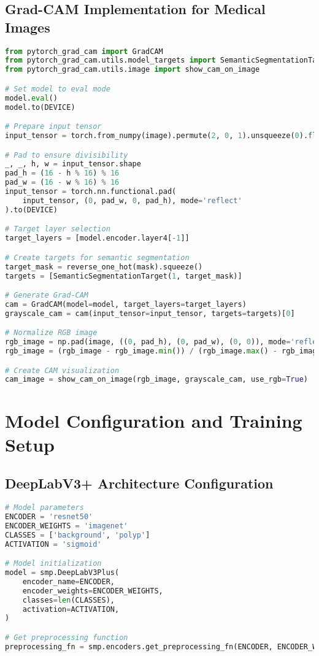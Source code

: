 \documentclass[12pt,a4paper]{report}
\begin{document}
\section{Grad-CAM Implementation for Medical Images}
\begin{lstlisting}[language=Python, caption=Grad-CAM Implementation]
from pytorch_grad_cam import GradCAM
from pytorch_grad_cam.utils.model_targets import SemanticSegmentationTarget
from pytorch_grad_cam.utils.image import show_cam_on_image

# Set model to eval mode
model.eval()
model.to(DEVICE)

# Prepare input tensor
input_tensor = torch.from_numpy(image).permute(2, 0, 1).unsqueeze(0).float()

# Pad to ensure divisibility
_, _, h, w = input_tensor.shape
pad_h = (16 - h % 16) % 16
pad_w = (16 - w % 16) % 16
input_tensor = torch.nn.functional.pad(
    input_tensor, (0, pad_w, 0, pad_h), mode='reflect'
).to(DEVICE)

# Target layer selection
target_layers = [model.encoder.layer4[-1]]

# Create targets for semantic segmentation
target_mask = reverse_one_hot(mask).squeeze()
targets = [SemanticSegmentationTarget(1, target_mask)]

# Generate Grad-CAM
cam = GradCAM(model=model, target_layers=target_layers)
grayscale_cam = cam(input_tensor=input_tensor, targets=targets)[0]

# Normalize RGB image
rgb_image = np.pad(image, ((0, pad_h), (0, pad_w), (0, 0)), mode='reflect')
rgb_image = (rgb_image - rgb_image.min()) / (rgb_image.max() - rgb_image.min())

# Create CAM visualization
cam_image = show_cam_on_image(rgb_image, grayscale_cam, use_rgb=True)
\end{lstlisting}

\chapter{Model Configuration and Training Setup}

\section{DeepLabV3+ Architecture Configuration}
\begin{lstlisting}[language=Python, caption=Model Configuration]
# Model parameters
ENCODER = 'resnet50'
ENCODER_WEIGHTS = 'imagenet'
CLASSES = ['background', 'polyp']
ACTIVATION = 'sigmoid'

# Model initialization
model = smp.DeepLabV3Plus(
    encoder_name=ENCODER,
    encoder_weights=ENCODER_WEIGHTS,
    classes=len(CLASSES),
    activation=ACTIVATION,
)

# Get preprocessing function
preprocessing_fn = smp.encoders.get_preprocessing_fn(ENCODER, ENCODER_WEIGHTS)
\end{lstlisting}
\end{document}
